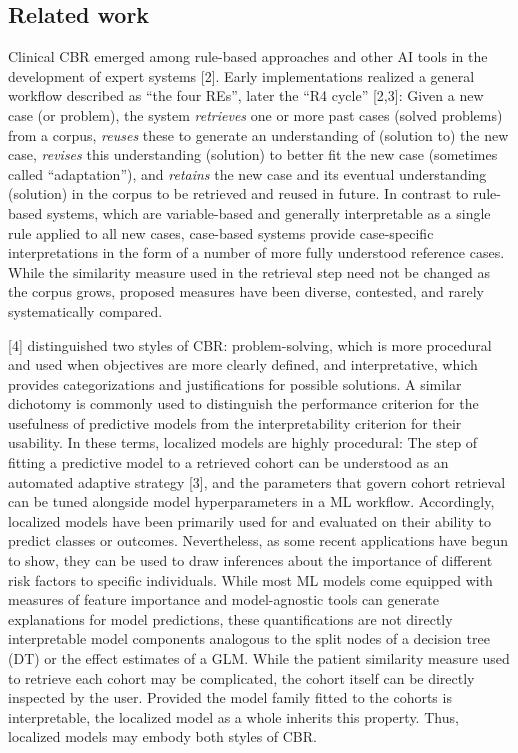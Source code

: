 \documentclass[preprint, 3p,
authoryear]{elsarticle} %
\begin{document}
\hypertarget{related-work}{%
\subsection{Related work}\label{related-work}}

Clinical CBR emerged among rule-based approaches and other AI tools in
the development of expert systems {[}2{]}. Early implementations
realized a general workflow described as ``the four REs'', later the
``R4 cycle'' {[}2,3{]}: Given a new case (or problem), the system
\emph{retrieves} one or more past cases (solved problems) from a corpus,
\emph{reuses} these to generate an understanding of (solution to) the
new case, \emph{revises} this understanding (solution) to better fit the
new case (sometimes called ``adaptation''), and \emph{retains} the new
case and its eventual understanding (solution) in the corpus to be
retrieved and reused in future. In contrast to rule-based systems, which
are variable-based and generally interpretable as a single rule applied
to all new cases, case-based systems provide case-specific
interpretations in the form of a number of more fully understood
reference cases. While the similarity measure used in the retrieval step
need not be changed as the corpus grows, proposed measures have been
diverse, contested, and rarely systematically compared.

{[}4{]} distinguished two styles of CBR: problem-solving, which is more
procedural and used when objectives are more clearly defined, and
interpretative, which provides categorizations and justifications for
possible solutions. A similar dichotomy is commonly used to distinguish
the performance criterion for the usefulness of predictive models from
the interpretability criterion for their usability. In these terms,
localized models are highly procedural: The step of fitting a predictive
model to a retrieved cohort can be understood as an automated adaptive
strategy {[}3{]}, and the parameters that govern cohort retrieval can be
tuned alongside model hyperparameters in a ML workflow. Accordingly,
localized models have been primarily used for and evaluated on their
ability to predict classes or outcomes. Nevertheless, as some recent
applications have begun to show, they can be used to draw inferences
about the importance of different risk factors to specific individuals.
While most ML models come equipped with measures of feature importance
and model-agnostic tools can generate explanations for model
predictions, these quantifications are not directly interpretable model
components analogous to the split nodes of a decision tree (DT) or the
effect estimates of a GLM. While the patient similarity measure used to
retrieve each cohort may be complicated, the cohort itself can be
directly inspected by the user. Provided the model family fitted to the
cohorts is interpretable, the localized model as a whole inherits this
property. Thus, localized models may embody both styles of CBR.
\end{document}
